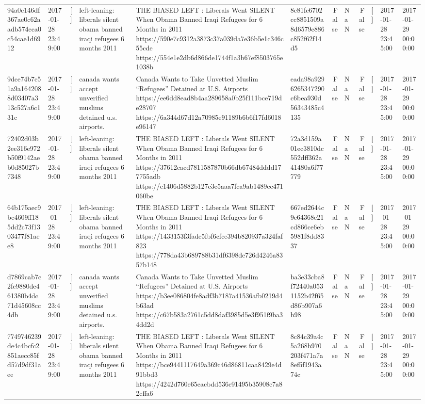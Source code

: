 \begin{tabular}{llllllrlrlll}
94a0c146df367ae0c62aadb574eca0c54cae1d6912 & 2017-01-28 23:49:00 & [] & left-leaning: liberals silent obama banned iraqi refugees 6 months 2011 & THE BIASED LEFT : Liberals Went SILENT When Obama Banned Iraqi Refugees for 6 Months in 2011 https://590e7c9312a3873c37a039da7e36b5e1c346c55cde https://554e1e2db6d866de1744f1a3b67ef8503765e1038b & 8c81fc6702cc8851509a8d6579c886c852f62f14d5 & False & NaN & False & [] & 2017-01-28 23:45:00 & 2017-01-29 00:00:00 \\
9dce74b7c51a9a1642088d03407a313c527a6c131c & 2017-01-28 23:49:00 & [] & canada wants accept unverified muslims detained u.s. airports. & Canada Wants to Take Unvetted Muslim “Refugees” Detained at U.S. Airports https://ee6dd8ead8b4aa289658a0b25f111bce719de28707 https://6a344d67d12a70985e91189b6b6f17fd6018e96147 & eada98a9296265347290c6bea930d56343485c4135 & False & NaN & False & [] & 2017-01-28 23:45:00 & 2017-01-29 00:00:00 \\
72402d03b2ee316e972b50f9142aeb0d85027b7348 & 2017-01-28 23:49:00 & [] & left-leaning: liberals silent obama banned iraqi refugees 6 months 2011 & THE BIASED LEFT : Liberals Went SILENT When Obama Banned Iraqi Refugees for 6 Months in 2011 https://37612cacd7811587870b66db67484dddd177755adb https://e1406d5882b127c3e5aaa7fca9ab1489cc471060be & 72a3d159a01ec3810dc552dff362a41480a6f77779 & False & NaN & False & [] & 2017-01-28 23:45:00 & 2017-01-29 00:00:00 \\
64b175aec9bc4609ff185dd2c73f1303477f81aee8 & 2017-01-28 23:49:00 & [] & left-leaning: liberals silent obama banned iraqi refugees 6 months 2011 & THE BIASED LEFT : Liberals Went SILENT When Obama Banned Iraqi Refugees for 6 Months in 2011 https://1433153f3fade5fbf6cfce394b820937a324faf823 https://778da43b689788b31df6398de726d4246a8357b148 & 667ed2644c9c64368e21cd866ce6eb5981f8dd8337 & False & NaN & False & [] & 2017-01-28 23:45:00 & 2017-01-29 00:00:00 \\
d7869cab7c2fc9880de461380b4dc71d45608cc4db & 2017-01-28 23:49:00 & [] & canada wants accept unverified muslims detained u.s. airports. & Canada Wants to Take Unvetted Muslim “Refugees” Detained at U.S. Airports https://b3ee086804fe8adf3b7187a41536afb0219d4b63ad https://c67b583a2761c5dd8daf3985d5e3f951f9ba34dd2d & ba3e33cba8f72440a0531152b42f65d86b907a6b98 & False & NaN & False & [] & 2017-01-28 23:45:00 & 2017-01-29 00:00:00 \\
7749746239de4c4bcfc2851aecc85fd57d9df31aee & 2017-01-28 23:49:00 & [] & left-leaning: liberals silent obama banned iraqi refugees 6 months 2011 & THE BIASED LEFT : Liberals Went SILENT When Obama Banned Iraqi Refugees for 6 Months in 2011 https://bce9441117649a369c46d86811caa8429e4d91bbd3 https://4242d760e65eacbdd536c91495b35908c7a82cffa6 & 8c84c39a4c5a268b970203f471a7a8ef5f1943a74c & False & NaN & False & [] & 2017-01-28 23:45:00 & 2017-01-29 00:00:00 \\

\end{tabular}
